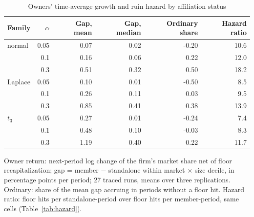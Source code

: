 \begin{table}[htbp]
\centering
\caption{Owners' time-average growth and ruin hazard by affiliation status}
\label{tab:owner}
\small
\begin{tabular}{lrrrrr}
\toprule
Family & $\alpha$ & Gap, mean & Gap, median & Ordinary share & Hazard ratio \\
\midrule
normal & 0.05 & 0.07 & 0.02 & -0.20 & 10.6 \\
 & 0.1 & 0.16 & 0.06 & 0.22 & 12.0 \\
 & 0.3 & 0.51 & 0.32 & 0.50 & 18.2 \\
\midrule
Laplace & 0.05 & 0.10 & 0.01 & -0.50 & 8.5 \\
 & 0.1 & 0.26 & 0.11 & 0.03 & 9.5 \\
 & 0.3 & 0.85 & 0.41 & 0.38 & 13.9 \\
\midrule
$t_3$ & 0.05 & 0.27 & 0.01 & -0.24 & 7.4 \\
 & 0.1 & 0.48 & 0.10 & -0.03 & 8.3 \\
 & 0.3 & 1.19 & 0.40 & 0.22 & 11.7 \\
\bottomrule
\end{tabular}
\par\smallskip\begin{minipage}{0.95\linewidth}\footnotesize Owner return: next-period log change of the firm's market share net of floor recapitalization; gap = member $-$ standalone within market $\times$ size decile, in percentage points per period; 27 traced runs, means over three replications. Ordinary: share of the mean gap accruing in periods without a floor hit. Hazard ratio: floor hits per standalone-period over floor hits per member-period, same cells (Table~\ref{tab:hazard}).\end{minipage}
\end{table}
